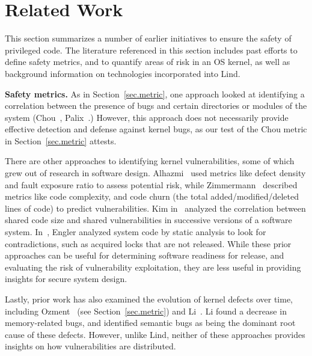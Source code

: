 \section{Related Work}
\label{sec.related_work}

This section summarizes a number of earlier initiatives to ensure the safety of
 privileged code. %
The literature referenced in this section includes past efforts to define safety metrics,
and to quantify areas of risk in an OS kernel, as well as background information
 on technologies incorporated into Lind.

\textbf{Safety metrics.}
As in Section~\ref{sec.metric}, one 
approach looked at identifying a correlation between the presence of bugs
and certain directories or modules of the system (Chou~\cite{PittSFIeld},
Palix~\cite{palix2011faults}.)
However, this approach does not necessarily
provide effective detection and defense against kernel bugs, as our test of the
Chou metric in Section~\ref{sec.metric} attests.

There are other approaches to identifying kernel vulnerabilities, some of
which grew out of research in 
software design.
Alhazmi~\cite{alhazmi2008application}
used metrics like defect density and fault exposure ratio to assess potential risk,
while Zimmermann~\cite{zimmermann2010searching}
described metrics like code complexity, and code churn (the total added/modified/deleted 
lines of code) to predict vulnerabilities. Kim in~\cite{kim2007vulnerability} analyzed
the correlation between shared code size and shared vulnerabilities in
successive versions of a software system. In~\cite{engler2001bugs}, Engler analyzed
system code by static analysis to look for contradictions, such as acquired locks that are
not released. While
these prior approaches can be useful for determining software readiness for release, and
evaluating the risk of vulnerability exploitation,
they are less useful in providing insights for secure system design.

Lastly, prior work has also examined the evolution of kernel defects over time, including
Ozment~\cite{ozment2006milk} (see Section~\ref{sec.metric}) and Li~\cite{li2006have}.
Li found a decrease in memory-related
bugs, and identified semantic bugs as being the dominant root cause of these
defects.
However, unlike Lind, neither of these approaches provides insights
on how vulnerabilities are distributed.

